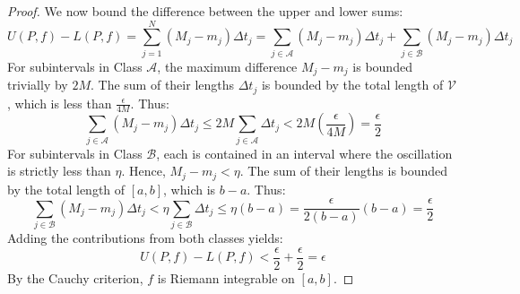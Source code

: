 \begin{proof}
We now bound the difference between the upper and lower sums:
\[
U(P, f) - L(P, f) = \sum_{j=1}^N (M_j - m_j) \Delta t_j = \sum_{j \in \mathcal{A}} (M_j - m_j) \Delta t_j + \sum_{j \in \mathcal{B}} (M_j - m_j) \Delta t_j
\]
For subintervals in Class $\mathcal{A}$, the maximum difference $M_j - m_j$ is bounded trivially by $2M$. The sum of their lengths $\Delta t_j$ is bounded by the total length of $\mathcal{V}$, which is less than $\frac{\epsilon}{4M}$. Thus:
\[
\sum_{j \in \mathcal{A}} (M_j - m_j) \Delta t_j \le 2M \sum_{j \in \mathcal{A}} \Delta t_j < 2M \left( \frac{\epsilon}{4M} \right) = \frac{\epsilon}{2}
\]
For subintervals in Class $\mathcal{B}$, each is contained in an interval where the oscillation is strictly less than $\eta$. Hence, $M_j - m_j < \eta$. The sum of their lengths is bounded by the total length of $[a, b]$, which is $b - a$. Thus:
\[
\sum_{j \in \mathcal{B}} (M_j - m_j) \Delta t_j < \eta \sum_{j \in \mathcal{B}} \Delta t_j \le \eta (b - a) = \frac{\epsilon}{2(b - a)} (b - a) = \frac{\epsilon}{2}
\]
Adding the contributions from both classes yields:
\[
U(P, f) - L(P, f) < \frac{\epsilon}{2} + \frac{\epsilon}{2} = \epsilon
\]
By the Cauchy criterion, $f$ is Riemann integrable on $[a, b]$.
\end{proof}